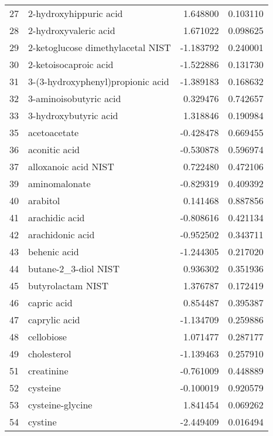 \begin{tabular}{llrr}
27  &             2-hydroxyhippuric acid &  1.648800 &  0.103110 \\
28  &              2-hydroxyvaleric acid &  1.671022 &  0.098625 \\
29  &  2-ketoglucose dimethylacetal NIST & -1.183792 &  0.240001 \\
30  &              2-ketoisocaproic acid & -1.522886 &  0.131730 \\
31  &  3-(3-hydroxyphenyl)propionic acid & -1.389183 &  0.168632 \\
32  &             3-aminoisobutyric acid &  0.329476 &  0.742657 \\
33  &              3-hydroxybutyric acid &  1.318846 &  0.190984 \\
35  &                       acetoacetate & -0.428478 &  0.669455 \\
36  &                      aconitic acid & -0.530878 &  0.596974 \\
37  &               alloxanoic acid NIST &  0.722480 &  0.472106 \\
39  &                      aminomalonate & -0.829319 &  0.409392 \\
40  &                           arabitol &  0.141468 &  0.887856 \\
41  &                     arachidic acid & -0.808616 &  0.421134 \\
42  &                   arachidonic acid & -0.952502 &  0.343711 \\
43  &                       behenic acid & -1.244305 &  0.217020 \\
44  &               butane-2\_3-diol NIST &  0.936302 &  0.351936 \\
45  &                  butyrolactam NIST &  1.376787 &  0.172419 \\
46  &                        capric acid &  0.854487 &  0.395387 \\
47  &                      caprylic acid & -1.134709 &  0.259886 \\
48  &                         cellobiose &  1.071477 &  0.287177 \\
49  &                        cholesterol & -1.139463 &  0.257910 \\
51  &                         creatinine & -0.761009 &  0.448889 \\
52  &                           cysteine & -0.100019 &  0.920579 \\
53  &                   cysteine-glycine &  1.841454 &  0.069262 \\
54  &                            cystine & -2.449409 &  0.016494 \\

\end{tabular}
